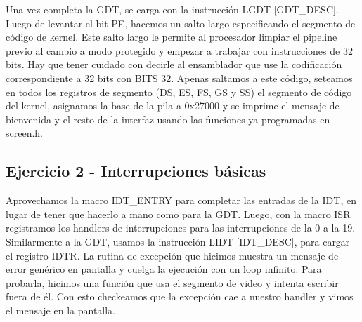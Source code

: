 \documentclass[10pt,a4paper,spanish]{article}
\begin{document}
Una vez completa la GDT, se carga con la instrucción LGDT [GDT_DESC].
Luego de levantar el bit PE, hacemos un salto largo especificando el segmento de código de kernel. Este salto largo le permite al procesador limpiar el pipeline previo al cambio a modo protegido y empezar a trabajar con instrucciones de 32 bits. Hay que tener cuidado con decirle al ensamblador que use la codificación correspondiente a 32 bits con BITS 32.
Apenas saltamos a este código, seteamos en todos los registros de segmento (DS, ES, FS, GS y SS) el segmento de código del kernel, asignamos la base de la pila a 0x27000 y se imprime el mensaje de bienvenida y el resto de la interfaz usando las funciones ya programadas en screen.h.

\subsection{Ejercicio 2 - Interrupciones básicas}
Aprovechamos la macro IDT_ENTRY para completar las entradas de la IDT, en lugar de tener que hacerlo a mano como para la GDT. Luego, con la macro ISR registramos los handlers de interrupciones para las interrupciones de la 0 a la 19.
Similarmente a la GDT, usamos la instrucción LIDT [IDT_DESC], para cargar el registro IDTR.
La rutina de excepción que hicimos muestra un mensaje de error genérico en pantalla y cuelga la ejecución con un loop infinito. Para probarla, hicimos una función que usa el segmento de video y intenta escribir fuera de él. Con esto checkeamos que la excepción cae a nuestro handler y vimos el mensaje en la pantalla.
\end{document}
